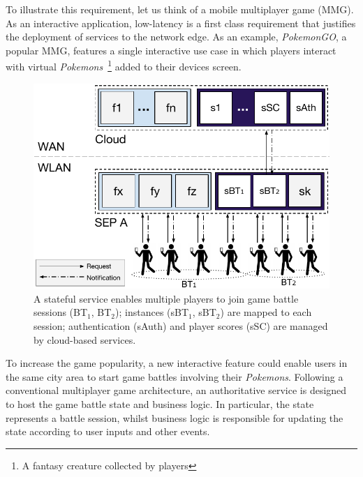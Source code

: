 To illustrate this requirement, let us think of a mobile multiplayer game (MMG). As an interactive application, low-latency is a first class requirement that justifies the deployment of services to the network edge. As an example, \textit{PokemonGO}, a popular MMG, features a single interactive use case in which players interact with virtual \textit{Pokemons}~\footnote{A fantasy creature collected by players} added to their devices screen. 
%

\begin{figure}[tbp]
	\centering
	\includegraphics[width=\linewidth]{Figs/Stateful_Edge_Services.pdf}
	\caption{A stateful service enables multiple players to join game battle sessions (BT$_1$, BT$_2$); instances (sBT$_1$, sBT$_2$) are mapped to each session; authentication (sAuth) and player scores (sSC) are managed by cloud-based services.}
	\label{fig:Steteful_Edge_MMG}
\end{figure}

To increase the game popularity, a new interactive feature could enable users in the same city area to start game battles involving their \textit{Pokemons}. Following a conventional multiplayer game architecture, an authoritative service is designed to host the game battle state and business logic. In particular, the state represents a battle session, whilst business logic is responsible for updating the state according to user inputs and other events. 

